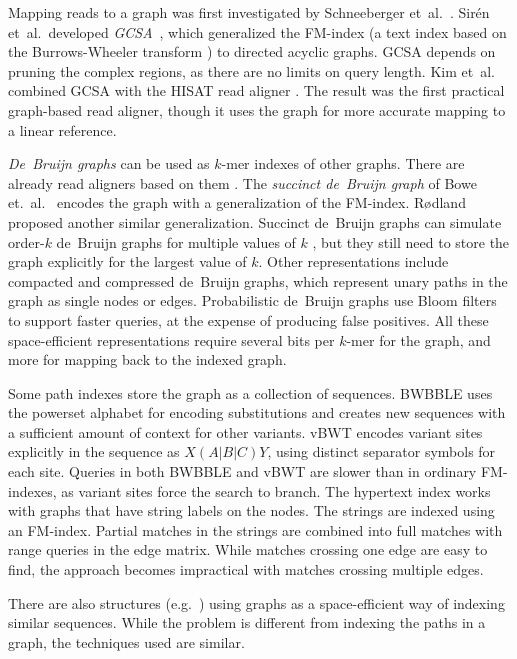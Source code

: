 \documentclass[twoside,leqno,twocolumn]{article}
\newcommand{\kmer}[1]{$#1$\nobreakdash-mer}
\newcommand{\orderk}[1]{order\nobreakdash-$#1$}
\begin{document}
Mapping reads to a graph was first investigated by Schneeberger et~al.~\cite{Schneeberger2009}. Sirén et~al.\ developed \emph{GCSA}~\cite{Siren2014}, which generalized the FM\nobreakdash-index \cite{Ferragina2005a} (a text index based on the Burrows-Wheeler transform \cite{Burrows1994}) to directed acyclic graphs. GCSA depends on pruning the complex regions, as there are no limits on query length. Kim et~al.~\cite{Kim2015-2016} combined GCSA with the HISAT read aligner \cite{Kim2015}. The result was the first practical graph-based read aligner, though it uses the graph for more accurate mapping to a linear reference.

\emph{De~Bruijn graphs} can be used as \kmer{k} indexes of other graphs. There are already read aligners based on them \cite{Limasset2015,Liu2016}. The \emph{succinct de~Bruijn graph} of Bowe et.~al.~\cite{Bowe2012} encodes the graph with a generalization of the FM\nobreakdash-index. Rødland \cite{Roedland2013} proposed another similar generalization. Succinct de~Bruijn graphs can simulate \orderk{k} de~Bruijn graphs for multiple values of $k$ \cite{Boucher2014}, but they still need to store the graph explicitly for the largest value of $k$. Other representations include compacted \cite{Cazaux2014} and compressed \cite{Marcus2014} de~Bruijn graphs, which represent unary paths in the graph as single nodes or edges. Probabilistic de~Bruijn graphs \cite{Pell2012} use Bloom filters to support faster queries, at the expense of producing false positives. All these space-efficient representations require several bits per \kmer{k} for the graph, and more for mapping back to the indexed graph.

Some path indexes store the graph as a collection of sequences. BWBBLE \cite{Huang2013} uses the powerset alphabet for encoding substitutions and creates new sequences with a sufficient amount of context for other variants. vBWT \cite{Maciuca2016} encodes variant sites explicitly in the sequence as $X(A|B|C)Y$, using distinct separator symbols for each site. Queries in both BWBBLE and vBWT are slower than in ordinary FM\nobreakdash-indexes, as variant sites force the search to branch. The hypertext index \cite{Thachuk2013} works with graphs that have string labels on the nodes. The strings are indexed using an FM-index. Partial matches in the strings are combined into full matches with range queries in the edge matrix. While matches crossing one edge are easy to find, the approach becomes impractical with matches crossing multiple edges.

There are also structures (e.g.~\cite{Huang2010,Wandelt2013,Danek2014,Na2015,Na2016}) using graphs as a space-efficient way of indexing similar sequences. While the problem is different from indexing the paths in a graph, the techniques used are similar.
\end{document}
